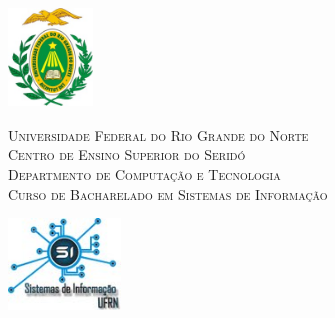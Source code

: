 
\begin{titlepage}
	\begin{center}
		
		\begin{minipage}{2.3cm}
			\begin{center}
				\includegraphics[width=2.25cm, height=2.68cm]{Imagens/Brasao-UFRN.jpg}
			\end{center}
		\end{minipage}
		\begin{minipage}{11.15cm}
			\begin{center}
				\begin{espacosimples}
					{\small 
                       \textsc{Universidade Federal do Rio Grande do Norte}		   			\\
							  \textsc{Centro de Ensino Superior do Seridó}					\\
							  \textsc{Departmento de Computação e Tecnologia}	   	\\
							  \textsc{Curso de Bacharelado em Sistemas de Informação} } 
	\end{espacosimples}
			\end{center}
		\end{minipage}
		\begin{minipage}{2.3cm}
			\begin{center}
				\includegraphics[width=3cm]{Imagens/bsi}
			\end{center}
		\end{minipage}
			
		\vspace{6cm}
						

\end{center}
\end{titlepage}
